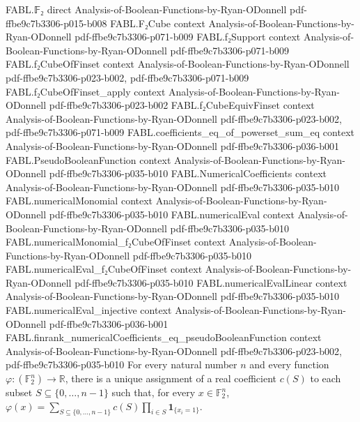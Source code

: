 \begin{theorem}
\label{FABL.existsUnique_numericalEval}
\leanok
{}
\proofstep
  {FABL.𝔽₂}
  {direct}
  {Analysis-of-Boolean-Functions-by-Ryan-ODonnell}
  {pdf-ffbe9c7b3306-p015-b008}
\proofstep
  {FABL.F₂Cube}
  {context}
  {Analysis-of-Boolean-Functions-by-Ryan-ODonnell}
  {pdf-ffbe9c7b3306-p071-b009}
\proofstep
  {FABL.f₂Support}
  {context}
  {Analysis-of-Boolean-Functions-by-Ryan-ODonnell}
  {pdf-ffbe9c7b3306-p071-b009}
\proofstep
  {FABL.f₂CubeOfFinset}
  {context}
  {Analysis-of-Boolean-Functions-by-Ryan-ODonnell}
  {pdf-ffbe9c7b3306-p023-b002,
    pdf-ffbe9c7b3306-p071-b009}
\proofstep
  {FABL.f₂CubeOfFinset_apply}
  {context}
  {Analysis-of-Boolean-Functions-by-Ryan-ODonnell}
  {pdf-ffbe9c7b3306-p023-b002}
\proofstep
  {FABL.f₂CubeEquivFinset}
  {context}
  {Analysis-of-Boolean-Functions-by-Ryan-ODonnell}
  {pdf-ffbe9c7b3306-p023-b002,
    pdf-ffbe9c7b3306-p071-b009}
\proofstep
  {FABL.coefficients_eq_of_powerset_sum_eq}
  {context}
  {Analysis-of-Boolean-Functions-by-Ryan-ODonnell}
  {pdf-ffbe9c7b3306-p036-b001}
\proofstep
  {FABL.PseudoBooleanFunction}
  {context}
  {Analysis-of-Boolean-Functions-by-Ryan-ODonnell}
  {pdf-ffbe9c7b3306-p035-b010}
\proofstep
  {FABL.NumericalCoefficients}
  {context}
  {Analysis-of-Boolean-Functions-by-Ryan-ODonnell}
  {pdf-ffbe9c7b3306-p035-b010}
\proofstep
  {FABL.numericalMonomial}
  {context}
  {Analysis-of-Boolean-Functions-by-Ryan-ODonnell}
  {pdf-ffbe9c7b3306-p035-b010}
\proofstep
  {FABL.numericalEval}
  {context}
  {Analysis-of-Boolean-Functions-by-Ryan-ODonnell}
  {pdf-ffbe9c7b3306-p035-b010}
\proofstep
  {FABL.numericalMonomial_f₂CubeOfFinset}
  {context}
  {Analysis-of-Boolean-Functions-by-Ryan-ODonnell}
  {pdf-ffbe9c7b3306-p035-b010}
\proofstep
  {FABL.numericalEval_f₂CubeOfFinset}
  {context}
  {Analysis-of-Boolean-Functions-by-Ryan-ODonnell}
  {pdf-ffbe9c7b3306-p035-b010}
\proofstep
  {FABL.numericalEvalLinear}
  {context}
  {Analysis-of-Boolean-Functions-by-Ryan-ODonnell}
  {pdf-ffbe9c7b3306-p035-b010}
\proofstep
  {FABL.numericalEval_injective}
  {context}
  {Analysis-of-Boolean-Functions-by-Ryan-ODonnell}
  {pdf-ffbe9c7b3306-p036-b001}
\proofstep
  {FABL.finrank_numericalCoefficients_eq_pseudoBooleanFunction}
  {context}
  {Analysis-of-Boolean-Functions-by-Ryan-ODonnell}
  {pdf-ffbe9c7b3306-p023-b002,
    pdf-ffbe9c7b3306-p035-b010}
For every natural number $n$ and every function $\varphi:(\mathbb{F}_2^n)\to\mathbb{R}$,
there is a unique assignment of a real coefficient $c(S)$ to each subset
$S\subseteq\{0,\ldots,n-1\}$ such that, for every $x\in\mathbb{F}_2^n$,
$\varphi(x)=\sum_{S\subseteq\{0,\ldots,n-1\}}c(S)\prod_{i\in S}\mathbf{1}_{\{x_i=1\}}$.
\end{theorem}

